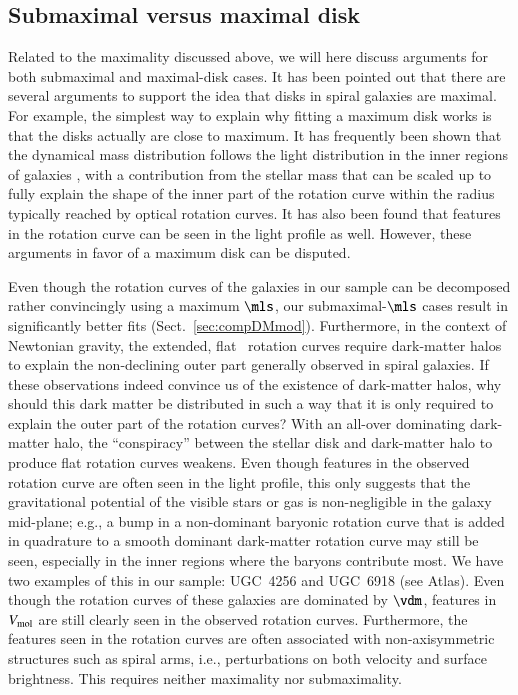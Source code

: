\documentclass[traditabstract]{aa} %
\begin{document}
\subsection{Submaximal versus maximal disk}
\label{sec:Disc-maxdisk}
Related to the maximality discussed above, we will here discuss arguments for both 
submaximal and maximal-disk cases.
It has been pointed out \citep[e.g., by][]{AlbadaSancisi1986} that there are several 
arguments to support the idea that disks in spiral galaxies are maximal. For example, the 
simplest way to explain why fitting a maximum disk works is that the disks actually are 
close to maximum. It has frequently been shown that the dynamical mass distribution 
follows the light distribution in the inner regions of galaxies 
\citep[e.g.,][]{kent1986,sancisi2004,noordermeer2007,swaters2011,fraternali2011}, with a 
contribution from the stellar mass that can be scaled up to fully explain the shape of the
inner part of the rotation curve within the radius typically reached by optical rotation 
curves. It has also been found that features in the rotation curve can be seen in the
light profile as well. However, these arguments in favor of a maximum disk can be 
disputed.

Even though the rotation curves of the galaxies in our sample can be decomposed rather 
convincingly using a maximum $\mls$, our submaximal-$\mls$ cases result in significantly
better fits (Sect.~\ref{sec:compDMmod}). Furthermore, in the context of Newtonian gravity,
the extended, flat \hone\ rotation curves require dark-matter halos to explain the
non-declining outer part generally observed in spiral galaxies. If these observations
indeed convince us of the existence of dark-matter halos, why should this dark matter be
distributed in such a way that it is only required to explain the outer part of the
rotation curves? With an all-over dominating dark-matter halo, the ``conspiracy''
\citep{bahcall1985} between the stellar disk and dark-matter halo to produce flat rotation
curves weakens.
%
Even though features in the observed rotation curve are often seen in the light profile,
this only suggests that the gravitational potential of the visible stars or gas is 
non-negligible in the galaxy mid-plane; e.g., a bump in a non-dominant baryonic
rotation curve that is added in quadrature to a smooth dominant dark-matter rotation curve
may still be seen, especially in the inner regions where the baryons contribute most. We
have two examples of this in our sample: UGC~4256 and UGC~6918 (see Atlas). Even though
the rotation curves of these galaxies are dominated by $\vdm$, features in $V_{\rm mol}$
are still clearly seen in the observed rotation curves. Furthermore, the features seen in
the rotation curves are often associated with non-axisymmetric structures such as 
spiral arms, i.e., perturbations on both velocity and surface brightness. This requires 
neither maximality nor submaximality. 
\end{document}
